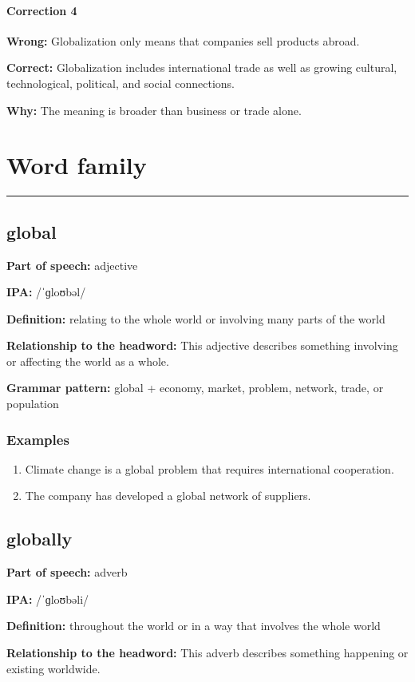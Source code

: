 \documentclass[11pt]{article}
\newcommand{\sectionrule}{\par\vspace{-0.5em}\noindent\textcolor{Accent}{\rule{\linewidth}{0.6pt}}\par}
\begin{document}
\paragraph{Correction 4}
\textbf{Wrong:} Globalization only means that companies sell products abroad.

\textbf{Correct:} Globalization includes international trade as well as growing cultural, technological, political, and social connections.

\textbf{Why:} The meaning is broader than business or trade alone.

\section{Word family}
\sectionrule
\subsection{global}
\textbf{Part of speech:} adjective

\textbf{IPA:} /ˈɡloʊbəl/

\textbf{Definition:} relating to the whole world or involving many parts of the world

\textbf{Relationship to the headword:} This adjective describes something involving or affecting the world as a whole.

\textbf{Grammar pattern:} global + economy, market, problem, network, trade, or population

\subsubsection{Examples}
\begin{enumerate}
  \item Climate change is a global problem that requires international cooperation.
  \item The company has developed a global network of suppliers.
\end{enumerate}

\subsection{globally}
\textbf{Part of speech:} adverb

\textbf{IPA:} /ˈɡloʊbəli/

\textbf{Definition:} throughout the world or in a way that involves the whole world

\textbf{Relationship to the headword:} This adverb describes something happening or existing worldwide.
\end{document}
